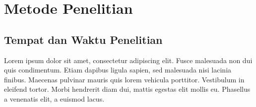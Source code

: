 \chapter{Metode Penelitian}
\section{Tempat dan Waktu Penelitian}
    Lorem ipsum dolor sit amet, consectetur adipiscing elit. Fusce malesuada non dui quis condimentum. Etiam dapibus ligula sapien, sed malesuada nisi lacinia finibus. Maecenas pulvinar mauris quis lorem vehicula porttitor. Vestibulum in eleifend tortor. Morbi hendrerit diam dui, mattis egestas elit mollis eu. Phasellus a venenatis elit, a euismod lacus.\par
